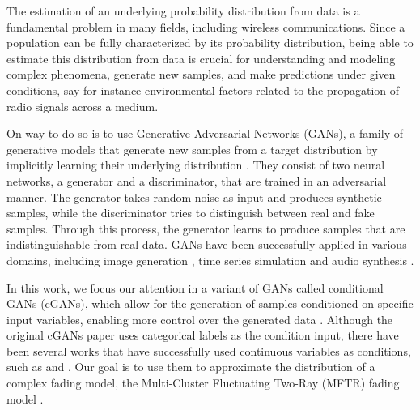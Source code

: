 The estimation of an underlying probability distribution from data is a fundamental problem in many fields, including wireless communications. Since a population can be fully characterized by its probability distribution, being able to estimate this distribution from data is crucial for understanding and modeling complex phenomena, generate new samples, and make predictions under given conditions, say for instance environmental factors related to the propagation of radio signals across a medium.

On way to do so is to use Generative Adversarial Networks (GANs), a family of generative models that generate new samples from a target distribution by implicitly learning their underlying distribution \cite{goodfellow2014generativeadversarialnetworks}. They consist of two neural networks, a generator and a discriminator, that are trained in an adversarial manner. The generator takes random noise as input and produces synthetic samples, while the discriminator tries to distinguish between real and fake samples. Through this process, the generator learns to produce samples that are indistinguishable from real data. GANs have been successfully applied in various domains, including image generation \cite{karras2019stylebasedgeneratorarchitecturegenerative}, time series simulation \cite{fu2019time} and audio synthesis \cite{donahue2019adversarialaudiosynthesis}.

In this work, we focus our attention in a variant of GANs called conditional GANs (cGANs), which allow for the generation of samples conditioned on specific input variables, enabling more control over the generated data \cite{mirza2014conditional}. Although the original cGANs paper uses categorical labels as the condition input, there have been several works that have successfully used continuous variables as conditions, such as \cite{fu2019time} and \cite{zaheer2017gan}. Our goal is to use them to approximate the distribution of a complex fading model, the Multi-Cluster Fluctuating Two-Ray (MFTR) fading model \cite{sánchez2023multiclusterfluctuatingtworayfading}. 

